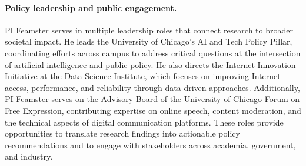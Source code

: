 \paragraph{Policy leadership and public engagement.} PI Feamster serves in
multiple leadership roles that connect research to broader societal impact. He
leads the University of Chicago's AI and Tech Policy Pillar, coordinating
efforts across campus to address critical questions at the intersection of
artificial intelligence and public policy. He also directs the Internet
Innovation Initiative at the Data Science Institute, which focuses on
improving Internet access, performance, and reliability through
data-driven approaches. Additionally, PI Feamster serves on the Advisory Board
of the University of Chicago Forum on Free Expression, contributing expertise
on online speech, content moderation, and the technical aspects of digital
communication platforms. These roles provide opportunities to translate
research findings into actionable policy recommendations and to engage with
stakeholders across academia, government, and industry.
